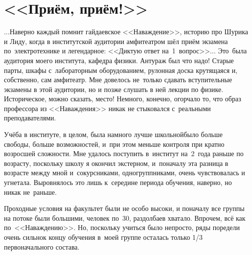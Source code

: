 \newpage
\section*{<<Приём, приём!>>}

$\ldots$Наверно каждый помнит гайдаевское <<Наваждение>>, историю про Шурика и Лиду, когда в институтской аудитории амфитеатром шёл приём экзамена по~электротехнике и легендарное: <<Диктую ответ на~1~вопрос>>$\ldots$ Это~была аудитория моего института, кафедра физики. Антураж был что надо! Старые парты, шкафы с~лабораторным оборудованием, рулонная доска крутящаяся и, собственно, сам амфитеатр. Мне довелось не~только сдавать вступительные экзамены в этой аудитории, но и позже слушать в ней лекции по физике. Историческое, можно сказать, место! Немного, конечно, огорчало то, что образ профессора из <<Наваждения>> никак не стыковался с~реальными преподавателями. 

Учёба в институте, в целом, была намного лучше школьной\mdash было больше свободы, больше возможностей, и~при этом меньше контроля при кратно возросшей сложности. Мне удалось поступить в~институт на~2~года раньше по возрасту, поскольку школу я окончил экстерном, и~поначалу эта разница в возрасте между мной и~сокурсниками, одногруппниками, очень чувствовалась и угнетала. Выровнялось это лишь к~середине периода обучения, наверно, но никак не~раньше.

Проходные условия на факультет были не особо высоки, и поначалу все группы на потоке были большими, человек по~30, раздолбаев хватало. Впрочем, всё как по~<<Наваждению>>. Но, поскольку учиться было непросто, ряды поредели очень сильно\mdash к концу обучения в~моей группе осталась только 1/3 первоначального состава. 



\begin{center}
\end{center}